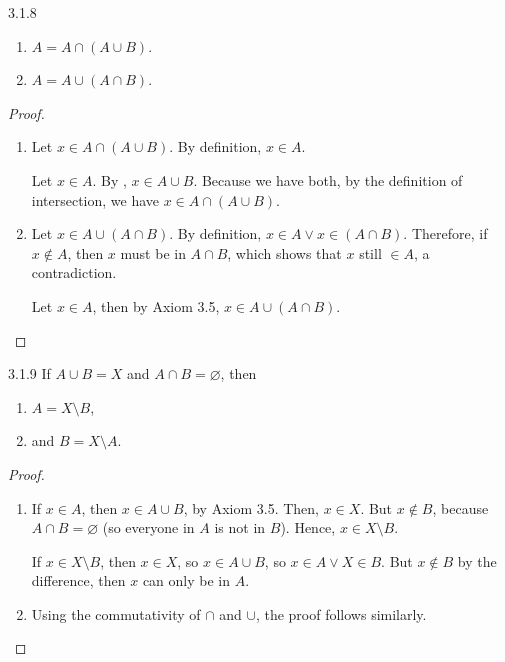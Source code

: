 \begin{exercise}{3.1.8}
	\begin{enumerate}
		\item $A = A \cap (A \cup B)$.
		\item $A = A \cup (A \cap B)$.
	\end{enumerate}
\end{exercise}
\begin{proof}\leavevmode
	\begin{enumerate}
		\item Let $x \in A \cap (A \cup B)$. By definition, $x \in A$. 
		
		Let $x \in A$. By , $x \in A \cup B$. Because we have both, by the definition of intersection, we have $x \in A \cap (A \cup B)$.
		
		\item Let $x \in A \cup (A \cap B)$. By definition, $x \in A \vee x \in (A \cap B)$. Therefore, if $x \notin A$, then $x$ must be in $A \cap B$, which shows that $x$ still $\in A$, a contradiction.
		
		Let $x \in A$, then by Axiom 3.5, $x \in A \cup (A \cap B)$. 
	\end{enumerate}
\end{proof}

\begin{exercise}{3.1.9}
	If $A \cup B = X$ and $A \cap B = \varnothing$, then
	\begin{enumerate}
		\item $A = X \setminus B$,
		\item and $B = X \setminus A$.
	\end{enumerate}
\end{exercise}
\begin{proof}\leavevmode
	\begin{enumerate}
		\item If $x \in A$, then $x \in A \cup B$, by Axiom 3.5. Then, $x \in X$. But $x \notin B$, because $A \cap B = \varnothing$ (so everyone in $A$ is not in $B$). Hence, $x \in X \setminus B$.
		
		If $x \in X \setminus B$, then $x \in X$, so $x \in A \cup B$, so $x \in A \vee X \in B$. But $x \notin B$ by the difference, then $x$ can only be in $A$.
		
		\item Using the commutativity of $\cap$ and $\cup$, the proof follows similarly.
	\end{enumerate}
\end{proof}

